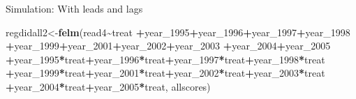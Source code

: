 \documentclass[
  ignorenonframetext,
]{beamer}
\newenvironment{Shaded}{\begin{snugshade}}{\end{snugshade}}
\newcommand{\DecValTok}[1]{\textcolor[rgb]{0.00,0.00,0.81}{#1}}
\newcommand{\KeywordTok}[1]{\textcolor[rgb]{0.13,0.29,0.53}{\textbf{#1}}}
\newcommand{\NormalTok}[1]{#1}
\newcommand{\OperatorTok}[1]{\textcolor[rgb]{0.81,0.36,0.00}{\textbf{#1}}}
\begin{document}
\begin{frame}[fragile]{Simulation: With leads and lags}
\begin{Shaded}
\begin{Highlighting}[]
\NormalTok{regdidall2\textless{}{-}}\KeywordTok{felm}\NormalTok{(read4}\OperatorTok{\textasciitilde{}}\NormalTok{treat}
                 \OperatorTok{+}\NormalTok{year\_}\DecValTok{1995}\OperatorTok{+}\NormalTok{year\_}\DecValTok{1996}\OperatorTok{+}\NormalTok{year\_}\DecValTok{1997}\OperatorTok{+}\NormalTok{year\_}\DecValTok{1998}
                 \OperatorTok{+}\NormalTok{year\_}\DecValTok{1999}\OperatorTok{+}\NormalTok{year\_}\DecValTok{2001}\OperatorTok{+}\NormalTok{year\_}\DecValTok{2002}\OperatorTok{+}\NormalTok{year\_}\DecValTok{2003}
                 \OperatorTok{+}\NormalTok{year\_}\DecValTok{2004}\OperatorTok{+}\NormalTok{year\_}\DecValTok{2005}
                 \OperatorTok{+}\NormalTok{year\_}\DecValTok{1995}\OperatorTok{*}\NormalTok{treat}\OperatorTok{+}\NormalTok{year\_}\DecValTok{1996}\OperatorTok{*}\NormalTok{treat}\OperatorTok{+}\NormalTok{year\_}\DecValTok{1997}\OperatorTok{*}\NormalTok{treat}\OperatorTok{+}\NormalTok{year\_}\DecValTok{1998}\OperatorTok{*}\NormalTok{treat}
                 \OperatorTok{+}\NormalTok{year\_}\DecValTok{1999}\OperatorTok{*}\NormalTok{treat}\OperatorTok{+}\NormalTok{year\_}\DecValTok{2001}\OperatorTok{*}\NormalTok{treat}\OperatorTok{+}\NormalTok{year\_}\DecValTok{2002}\OperatorTok{*}\NormalTok{treat}\OperatorTok{+}\NormalTok{year\_}\DecValTok{2003}\OperatorTok{*}\NormalTok{treat}
                 \OperatorTok{+}\NormalTok{year\_}\DecValTok{2004}\OperatorTok{*}\NormalTok{treat}\OperatorTok{+}\NormalTok{year\_}\DecValTok{2005}\OperatorTok{*}\NormalTok{treat,}
\NormalTok{                 allscores)}
\end{Highlighting}
\end{Shaded}
\end{frame}
\end{document}
